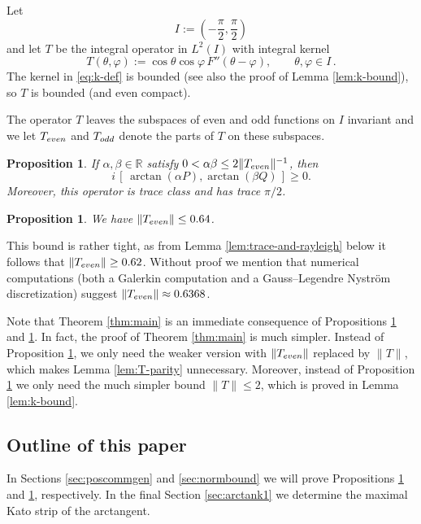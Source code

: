 \documentclass[10pt,a4paper]{amsart}
\newtheorem{proposition}[theorem]{Proposition}
\newcommand{\R}{\mathbb{R}}
\begin{document}
Let
\[
I:=\left(-\frac{\pi}{2},\frac{\pi}{2}\right)
\]
and let $T$ be the integral operator in $L^2(I)$ with integral kernel
\begin{equation}\label{eq:k-def}
T(\theta,\varphi)
:=\cos\theta\cos\varphi\,F''(\theta-\varphi),
\qquad \theta,\varphi\in I \,.
\end{equation}
The kernel in \eqref{eq:k-def} is bounded (see also the proof of Lemma \ref{lem:k-bound}), so $T$ is bounded (and even compact).

The operator $T$ leaves the subspaces of even and odd functions on $I$ invariant and we let $T_{\rm even}$ and $T_{\rm odd}$ denote the parts of $T$ on these subspaces.

\begin{proposition}\label{prop:poscommgen}
If $\alpha,\beta\in\R$ satisfy $0<\alpha\beta\leq 2\|T_{\rm even}\|^{-1}$, then
\[
i\,[\,\arctan(\alpha P),\arctan(\beta Q)\,]\geq0.
\]
Moreover, this operator is trace class and has trace
$\pi/2$.
\end{proposition}

\begin{proposition}\label{prop:normbound}
    We have $\|T_{\rm even}\| \leq 0.64$.
\end{proposition}

This bound is rather tight, as from Lemma \ref{lem:trace-and-rayleigh} below it follows that $\|T_{\rm even}\|\geq 0.62$. Without proof we mention that numerical computations (both a Galerkin computation and a Gauss--Legendre Nystr\"om discretization) suggest $\|T_{\rm even}\|\approx 0.6368$.

Note that Theorem \ref{thm:main} is an immediate consequence of Propositions \ref{prop:poscommgen} and \ref{prop:normbound}. In fact, the proof of Theorem \ref{thm:main} is much simpler. Instead of Proposition \ref{prop:poscommgen}, we only need the weaker version with $\|T_{\rm even}\|$ replaced by $\|T\|$, which makes Lemma \ref{lem:T-parity} unnecessary. Moreover, instead of Proposition \ref{prop:normbound} we only need the much simpler bound $\|T\|\leq 2$, which is proved in Lemma \ref{lem:k-bound}. 



\subsection*{Outline of this paper}

In Sections \ref{sec:poscommgen} and \ref{sec:normbound} we will prove Propositions \ref{prop:poscommgen} and \ref{prop:normbound}, respectively. In the final Section \ref{sec:arctank1} we determine the maximal Kato strip of the arctangent.
\end{document}
